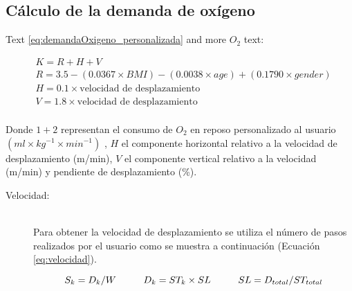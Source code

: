 \subsection{Cálculo de la demanda de oxígeno} \label{secc:calculoDemandaOxigeno}
Text  \ref{eq:demandaOxigeno_personalizada} and more $O_{2}$ text:

\begin{equation} \label{eq:demandaOxigeno_personalizada}
\begin{split} 
& K = R + H + V \\ 
& R = 3.5 - (0.0367 \times BMI) - (0.0038 \times age) + (0.1790 \times gender)\\
& H = 0.1 \times \textrm{velocidad de desplazamiento}\\ 
& V = 1.8 \times \textrm{velocidad de desplazamiento}\\ 
\end{split} 
\end{equation} 

Donde $1 + 2$ representan el consumo de $O_{2}$ en reposo personalizado al usuario $(ml \times kg^{-1} \times min^{-1})$ \citep{Barstow:1991}, $H$ el componente horizontal relativo a la velocidad de desplazamiento (m/min), $V$ el componente vertical relativo a la velocidad (m/min) y pendiente de desplazamiento (\%).

\begin{description}
  \item[Velocidad:] \hfill \\
  	Para obtener la velocidad de desplazamiento se utiliza el número de pasos realizados por el usuario como se muestra a continuación (Ecuación \ref{eq:velocidad}).
  
\begin{equation} \label{eq:velocidad}
  S_{k} = D_{k}/W \hspace{10 mm} 
  D_{k} = ST_{k} \times SL \hspace{10 mm}
  SL = D_{total}/ST_{total} 
\end{equation}

\end{description}
	
\newpage


